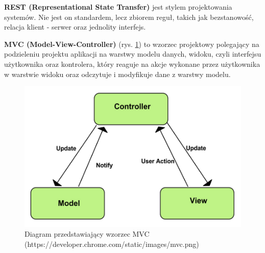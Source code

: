\textbf{REST (Representational State Transfer)} jest stylem projektowania systemów. Nie jest on standardem, lecz zbiorem reguł, takich jak bezstanowość, relacja klient - serwer oraz jednolity interfejs.\cite{rest}

\textbf{MVC (Model-View-Controller)} (rys. \ref{mvc}) to wzorzec projektowy polegający na podzieleniu projektu aplikacji na warstwy modelu danych, widoku, czyli interfejsu użytkownika oraz kontrolera, który reaguje na akcje wykonane przez użytkownika w warstwie widoku oraz odczytuje i modyfikuje dane z warstwy modelu.\cite{mvc}
\begin{figure}[!ht]
	\begin{center}
		\includegraphics[width=5in]{img/diagram/mvc.png}
		\caption{Diagram przedstawiający wzorzec MVC (https://developer.chrome.com/static/images/mvc.png)}
		\label{mvc}
	\end{center}
\end{figure}


